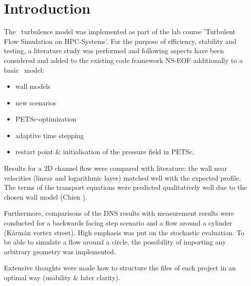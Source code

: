 \chapter{Introduction} %
\label{cha:introduction}



The \ke\, turbulence model was implemented as part of the lab course 'Turbulent Flow Simulation on HPC-Systems'. For the purpose of efficiency, stability and testing, a literature study was performed and following aspects have been considered and added to the existing code framework NS-EOF additionally to a basic \ke\, model:

\begin{itemize}
\item wall models
\item new scenarios
\item PETSc-optimization
\item adaptive time stepping
\item restart point \& initialisation of the pressure field in PETSc.
\end{itemize}

\noi Results for a 2D channel flow were compared with literature: the wall near velocities (linear and logarithmic layer) matched well with the expected profile. The terms of the transport equations were predicted qualitatively well due to the chosen wall model (Chien \citep{fan1993}).

\noii Furthermore, comparisons of the DNS results with measurement results were conducted for a backwards facing step scenario and a flow around a cylinder (K\'arm\'an vortex street).
High emphasis was put on the stochastic evaluation. To be able to simulate a flow around a circle, the possibility of importing any arbitrary geometry was implemented.

\noii Extensive thoughts were made how to structure the files of each project in an optimal way (usability \& later clarity).

